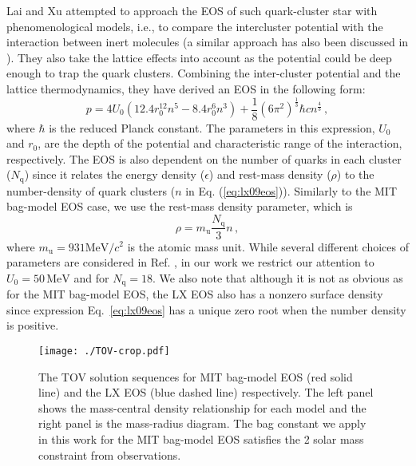 \documentclass[twocolumn,superscriptaddress,showpacs,prd,aps,amsmath,amssymb,nofootinbib]{revtex4-1}
\begin{document}
Lai and Xu attempted to approach the EOS of such quark-cluster star with
phenomenological models, i.e., to compare the intercluster potential with
the interaction between inert molecules (a similar approach has also been
discussed in \cite{Guo2014}). They also take the lattice effects into
account as the potential could be deep enough to trap the quark
clusters. Combining the inter-cluster potential and the lattice
thermodynamics, they have derived an EOS in the following form:
%
\begin{equation}
p=4U_0(12.4r_0^{12}n^5-8.4r_0^6n^3)+\frac{1}{8}(6\pi^2)^{\frac{1}{3}}\hbar cn^{\frac{4}{3}}\,,
\label{eq:lx09eos}
\end{equation}
%
where $\hbar$ is the reduced Planck constant.  The parameters in this
expression, $U_0$ and $r_0$, are the depth of the potential and
characteristic range of the interaction, respectively. The EOS is also
dependent on the number of quarks in each cluster ($N_\mathrm{q}$) since
it relates the energy density ($\epsilon$) and rest-mass density ($\rho$)
to the number-density of quark clusters ($n$ in
Eq. (\ref{eq:lx09eos})). Similarly to the MIT bag-model EOS case, we use
the rest-mass density parameter, which is
%
\begin{equation}
\rho=m_\mathrm{u}\frac{N_\mathrm{q}}{3}n\,,
\end{equation}
%
where $m_\mathrm{u}=931\mathrm{MeV}/c^2$ is the atomic mass unit. While
several different choices of parameters are considered in
Ref. \cite{lai2009}, in our work we restrict our attention to
$U_0=50\,\mathrm{MeV}$ and for $N_\mathrm{q}=18$. We also note that
although it is not as obvious as for the MIT bag-model EOS, the LX
EOS also has a nonzero surface density since expression
Eq.~\eqref{eq:lx09eos} has a unique zero root when the number density is
positive.

\begin{figure}
\begin{center}
\texttt{[image: ./TOV-crop.pdf]}
\end{center}
\caption{The TOV solution sequences for MIT bag-model EOS (red solid line)
  and the LX EOS (blue dashed line) respectively. The left panel shows the
  mass-central density relationship for each model and the right panel is
  the mass-radius diagram. The bag constant we apply in this work for the
  MIT bag-model EOS satisfies the 2 solar mass constraint from observations.}
\label{fig:plot_tov}
\end{figure}
\end{document}
